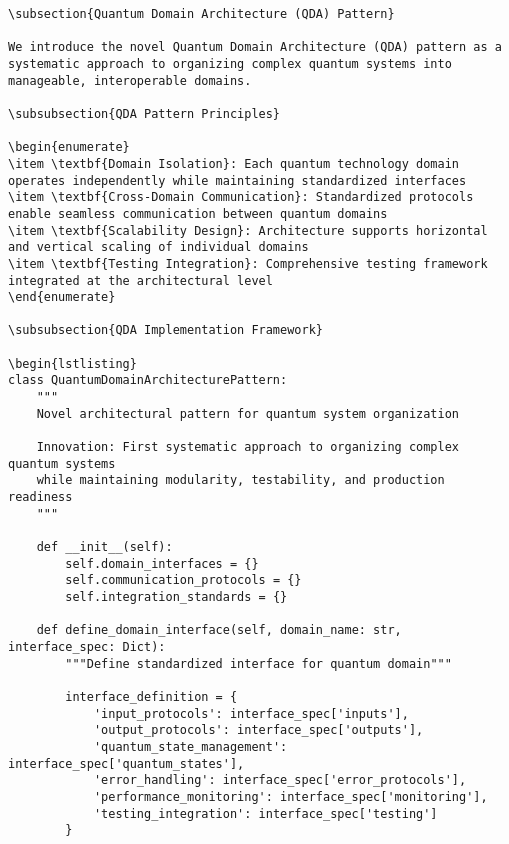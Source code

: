 \documentclass[12pt,a4paper]{report}
\begin{document}
\begin{lstlisting}
\subsection{Quantum Domain Architecture (QDA) Pattern}

We introduce the novel Quantum Domain Architecture (QDA) pattern as a systematic approach to organizing complex quantum systems into manageable, interoperable domains.

\subsubsection{QDA Pattern Principles}

\begin{enumerate}
\item \textbf{Domain Isolation}: Each quantum technology domain operates independently while maintaining standardized interfaces
\item \textbf{Cross-Domain Communication}: Standardized protocols enable seamless communication between quantum domains
\item \textbf{Scalability Design}: Architecture supports horizontal and vertical scaling of individual domains
\item \textbf{Testing Integration}: Comprehensive testing framework integrated at the architectural level
\end{enumerate}

\subsubsection{QDA Implementation Framework}

\begin{lstlisting}
class QuantumDomainArchitecturePattern:
    """
    Novel architectural pattern for quantum system organization

    Innovation: First systematic approach to organizing complex quantum systems
    while maintaining modularity, testability, and production readiness
    """

    def __init__(self):
        self.domain_interfaces = {}
        self.communication_protocols = {}
        self.integration_standards = {}

    def define_domain_interface(self, domain_name: str, interface_spec: Dict):
        """Define standardized interface for quantum domain"""

        interface_definition = {
            'input_protocols': interface_spec['inputs'],
            'output_protocols': interface_spec['outputs'],
            'quantum_state_management': interface_spec['quantum_states'],
            'error_handling': interface_spec['error_protocols'],
            'performance_monitoring': interface_spec['monitoring'],
            'testing_integration': interface_spec['testing']
        }


\end{lstlisting}
\end{document}
